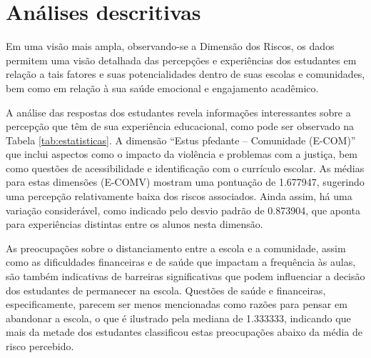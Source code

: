 


\section{Análises descritivas}



Em uma visão mais ampla, observando-se a Dimensão dos Riscos, os dados permitem uma visão detalhada das percepções e experiências dos estudantes em relação a tais fatores e suas potencialidades dentro de suas escolas e comunidades, bem como em relação à sua saúde emocional e engajamento acadêmico.

A análise das respostas dos estudantes revela informações interessantes sobre a percepção que têm de sua experiência educacional, como pode ser observado na Tabela \ref{tab:estatisticas}. A dimensão ``Estus pfedante – Comunidade (E-COM)'' que inclui aspectos como o impacto da violência e problemas com a justiça, bem como questões de acessibilidade e identificação com o currículo escolar. As médias para estas dimensões (E-COMV) mostram uma pontuação de 1.677947, sugerindo uma percepção relativamente baixa dos riscos associados. Ainda assim, há uma variação considerável, como indicado pelo desvio padrão de 0.873904, que aponta para experiências distintas entre os alunos nesta dimensão.

As preocupações sobre o distanciamento entre a escola e a comunidade, assim como as dificuldades financeiras e de saúde que impactam a frequência às aulas, são também indicativas de barreiras significativas que podem influenciar a decisão dos estudantes de permanecer na escola. Questões de saúde e financeiras, especificamente, parecem ser menos mencionadas como razões para pensar em abandonar a escola, o que é ilustrado pela mediana de 1.333333, indicando que mais da metade dos estudantes classificou estas preocupações abaixo da média de risco percebido.

